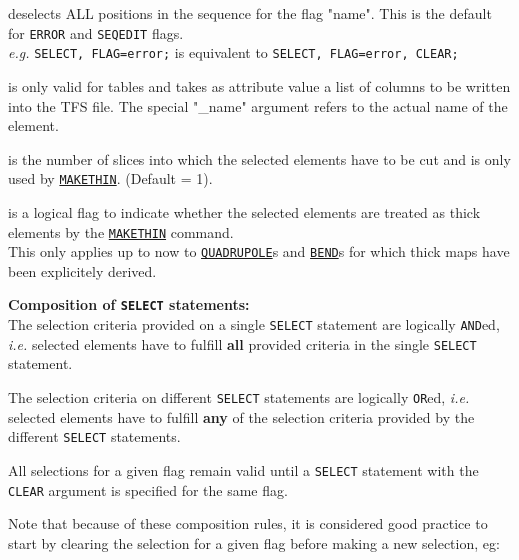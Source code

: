 \begin{madlist}
   deselects ALL positions in the sequence for the flag
  "name". This is the default for \texttt{ERROR} and \texttt{SEQEDIT}
  flags. \\
  \textsl{e.g.} \texttt{SELECT, FLAG=error;} is equivalent to
  \texttt{SELECT, FLAG=error, CLEAR;} 

   is only valid for tables and takes as attribute value
  a list of columns to be written into the TFS file. The special "\_name"
  argument refers to the actual name of the element. 

   is the number of slices into which the selected
  elements have to be cut and is only used by
  \hyperref[chap:makethin]{\texttt{MAKETHIN}}. (Default = 1). 

   is a logical flag to indicate  whether the selected
  elements are treated as thick elements by the
  \hyperref[chap:makethin]{\texttt{MAKETHIN}} command. \\  
  This only applies up to now to
  \hyperref[sec:quadrupole]{\texttt{QUADRUPOLE}}s and
  \hyperref[sec:bend]{\texttt{BEND}}s for which thick maps
  have been explicitely derived. 
\end{madlist}

\vskip 5mm
\textbf{Composition of \texttt{SELECT} statements:} \\
The selection criteria provided on a single \texttt{SELECT} statement
are logically \texttt{AND}ed, \textsl{i.e.} selected elements have to
fulfill \textbf{all} provided criteria in the single \texttt{SELECT}
statement. 

The selection criteria on different \texttt{SELECT} statements are
logically \texttt{OR}ed, \textsl{i.e.} selected elements have to fulfill
\textbf{any} of the selection criteria provided by the different
\texttt{SELECT} statements. 

All selections for a given flag remain valid until a \texttt{SELECT}
statement with the \texttt{CLEAR} argument is specified for the same flag.

Note that because of these composition rules, it is considered good
practice to start by clearing the selection for a given flag before
making a new selection, eg: 


